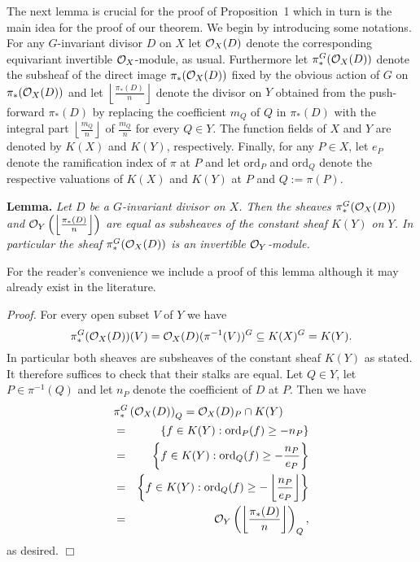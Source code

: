 \documentclass[12pt,leqno]{article}
\newcommand{\cO}{{\cal O}}
\begin{document}
The next lemma is crucial for the proof of Proposition~1 which
in turn is the main idea for the proof of our theorem. We begin
by introducing some notations. For any $G$-invariant divisor
$D$ on $X$ let $\cO_X(D)$ denote the corresponding equivariant
invertible $\cO_X$-module, as usual. Furthermore let
$\pi_*^G(\cO_X(D))$ denote the subsheaf of the direct image
$\pi_*(\cO_X(D))$ fixed by the obvious action of $G$ on
$\pi_*(\cO_X(D))$ and let $\left\lfloor \frac{\pi_*(D)}{n}
\right \rfloor$ denote the divisor on $Y$ obtained from the
push-forward $\pi_*(D)$ by replacing the coefficient $m_Q$ of
$Q$ in $\pi_*(D)$ with the integral part $\left \lfloor
\frac{m_Q}{n} \right \rfloor$ of $\frac{m_Q}{n}$ for every $Q
\in Y$. The function fields of $X$ and $Y$ are denoted by
$K(X)$ and $K(Y)$, respectively. Finally, for any $P \in X$,
let $e_P$ denote the ramification index of $\pi$ at $P$ and let
$\textrm{ord}_P$ and $\textrm{ord}_Q$ denote the respective
valuations of $K(X)$ and $K(Y)$ at $P$ and $Q:=\pi(P)$.

{\bf Lemma.} {\em Let $D$ be a $G$-invariant divisor on $X$.
Then the sheaves $\pi_*^G(\cO_X(D))$ and
$\cO_Y\left(\left\lfloor \frac{\pi_*(D)}{n}\right
\rfloor\right)$ are equal as subsheaves of the constant sheaf
$K(Y)$ on $Y$. In particular the sheaf $\pi_*^G(\cO_X(D))$ is
an invertible $\cO_Y$-module. }

For the reader's convenience we include a proof of this lemma
although it may already exist in the literature.

{\em Proof.} For every open subset $V$ of $Y$ we have
\[\pi_*^G(\cO_X(D))(V) = \cO_X(D) (\pi^{-1}(V))^G \subseteq K(X)^G = K(Y).\]
In particular both sheaves are subsheaves of the constant sheaf
$K(Y)$ as stated. It therefore suffices to check that their
stalks are equal. Let $Q \in Y$, let $P \in \pi^{-1}(Q)$ and
let $n_P$ denote the coefficient of $D$ at $P$. Then we have
\begin{eqnarray*}
\lefteqn{\pi_*^G\left(\cO_X(D)\right)_Q = \cO_X(D)_P \cap
K(Y)}\\
&=& \left\{f \in K(Y): \textrm{ord}_P(f) \ge -n_P\right\}\\
&=& \left\{f \in K(Y): \textrm{ord}_Q(f) \ge - \frac{n_P}{e_P}\right\}\\
&=& \left\{ f \in K(Y): \textrm{ord}_Q(f) \ge - \left\lfloor
\frac{n_P}{e_P} \right\rfloor \right\}\\
&=& \cO_Y\left(\left\lfloor \frac{\pi_*(D)}{n} \right\rfloor
\right)_Q,
\end{eqnarray*}
as desired. \hfill $\Box$
\end{document}
